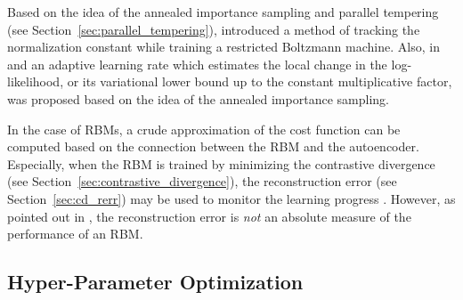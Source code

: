 \documentclass[dissertation,nocontribution]{aaltoseries}
\begin{document}
Based on the idea of the annealed importance sampling and
parallel tempering (see
Section~\ref{sec:parallel_tempering}),
\citet{Desjardins2011} introduced a method of tracking the
normalization constant while training a restricted Boltzmann
machine. Also, in  and
 an adaptive learning rate which
estimates the local change in the log-likelihood, or its
variational lower bound up to the constant multiplicative
factor, was
proposed based on the idea of the annealed importance
sampling.

In the case of RBMs, a crude approximation of the cost
function can be computed based on the connection between the
RBM and the autoencoder. Especially, when the RBM is trained
by minimizing the contrastive divergence (see
Section~\ref{sec:contrastive_divergence}), the
reconstruction error (see Section~\ref{sec:cd_rerr}) may be
used to monitor the learning progress \citep{Hinton2012rbm}.
However, as pointed out in \citep{Hinton2012rbm}, the
reconstruction error is \textit{not} an absolute measure of
the performance of an RBM.

\subsection{Hyper-Parameter Optimization}
\label{sec:hyperopt}
\end{document}
